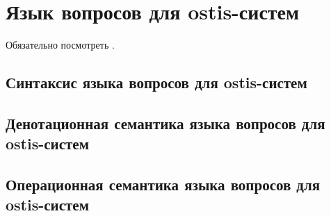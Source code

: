 \chapter{Язык вопросов для ostis-систем}
\label{chapter_requests}


Обязательно посмотреть .

\section{Синтаксис языка вопросов для ostis-систем}
\section{Денотационная семантика языка вопросов для ostis-систем}
\section{Операционная семантика языка вопросов для ostis-систем}

%